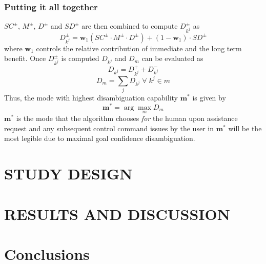 \documentclass[conference]{IEEEtran}
\newcommand{\argmax}{\arg\!\max}
\begin{document}
\subsubsection*{Putting it all together}
$SC^{\pm}$, $M^{\pm}$, $D^{\pm}$ and $SD^{\pm}$ are then combined to compute $D_{k^j}^{\pm}$ as 
\begin{equation*}
D_{k^j}^{\pm} = \boldsymbol{w}_1(SC^{\pm}\cdot M^{\pm} \cdot D^{\pm}) + (1 - \boldsymbol{w}_1)\cdot SD^{\pm}
\end{equation*}
where $\boldsymbol{w}_1$ controls the relative contribution of immediate and the long term benefit. 
Once $D_{k^j}^{\pm}$ is computed $D_{k^j}$ and $D_m$ can be evaluated as 
\begin{equation*}
D_{k^j} = D_{k^j}^{+} + D_{k^j}^{-}
\end{equation*}
\begin{equation*}
D_m = \sum_{j} D_{k^j} \; \forall \; k^j \in m
\end{equation*}
Thus, the mode with highest disambiguation capability $\boldsymbol{m}^{*}$ is given by
\begin{equation*}
\boldsymbol{m}^* = \argmax_m D_m
\end{equation*}
$\boldsymbol{m}^{*}$ is the mode that the algorithm chooses \textit{for} the human upon assistance request and any subsequent control command issues by the user in $\boldsymbol{m}^*$ will be the most legible due to maximal goal confidence disambiguation.

\section{STUDY DESIGN} \label{EXP}
\section{RESULTS AND DISCUSSION} \label{RES}
\section{Conclusions}\label{CON}


%
\end{document}
